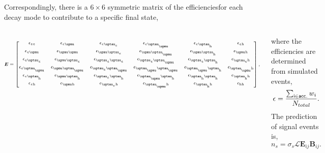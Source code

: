 \begin{frame}{}
    Correspondingly, there is a $6\times6$ symmetric matrix of the efficiencies\footnotemark for each decay mode to contribute to a specific final state,
    \begin{columns}
        \begin{equation*}
        \footnotesize
        \boldsymbol{E} = \begin{bmatrix}
            \epsilon_{\Pe\Pe}       & \epsilon_{\Pe\PGm}        & \epsilon_{\Pe\PGte}       & \epsilon_{\Pe\PGtmu}          & \epsilon_{\Pe\PGth}       & \epsilon_{\Pe \mathrm{h}}   \\
            \epsilon_{\Pe\PGm}      & \epsilon_{\PGm\PGm}       & \epsilon_{\PGm\PGte}      & \epsilon_{\PGm\PGtmu}         & \epsilon_{\PGm\PGth}      & \epsilon_{\PGm \mathrm{h}}  \\
            \epsilon_{\Pe\PGte}     & \epsilon_{\PGm\PGte}      & \epsilon_{\PGte\PGte}     & \epsilon_{\PGte\PGtmu}        & \epsilon_{\PGte\PGth}     & \epsilon_{\PGte \mathrm{h}} \\
            \epsilon_{\Pe\PGtmu}    & \epsilon_{\PGm\PGtmu}     & \epsilon_{\PGte\PGtmu}    & \epsilon_{\PGtmu\PGtmu}       & \epsilon_{\PGtmu\PGth}    & \epsilon_{\PGtmu \mathrm{h}}\\
            \epsilon_{\Pe\PGth}     & \epsilon_{\PGm\PGth}      & \epsilon_{\PGte\PGth}     & \epsilon_{\PGtmu\PGth}        & \epsilon_{\PGth\PGth}     & \epsilon_{\PGth \mathrm{h}} \\
            \epsilon_{\Pe\mathrm{h}}& \epsilon_{\PGm\mathrm{h}} & \epsilon_{\PGte\mathrm{h}}& \epsilon_{\PGtmu\mathrm{h}}   & \epsilon_{\PGth\mathrm{h}}& \epsilon_\mathrm{hh}        \\
        \end{bmatrix},
        \end{equation*}
        
        \smaller
        where the efficiencies are determined from simulated events,
        \begin{equation*}
            \epsilon = \frac{\sum_{\sf i\in acc.}w_{i}}{N_{total}}.
        \end{equation*}
        The prediction of signal events is,
        \begin{equation*}
            n_{s} = \sigma_{s} \mathcal{L} \mathbf{E}_{ij} \mathbf{B}_{ij}. 
        \end{equation*}
    \end{columns}
    

\end{frame}
